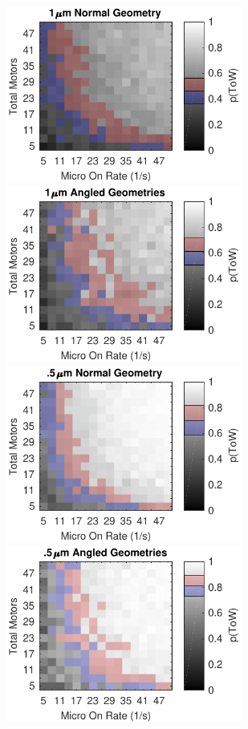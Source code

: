 \begin{figure}
\centering
\includegraphics[width=7.75cm]{appendix1/n1000ToW.pdf}
\hspace{.5cm}
\includegraphics[width=7.75cm]{appendix1/angled1000ToW.pdf}
\\ \vspace{.5cm}
\includegraphics[width=7.75cm]{appendix1/n500ToW.pdf}
\hspace{.5cm}
\includegraphics[width=7.75cm]{appendix1/angled500ToW.pdf}

\end{figure}
